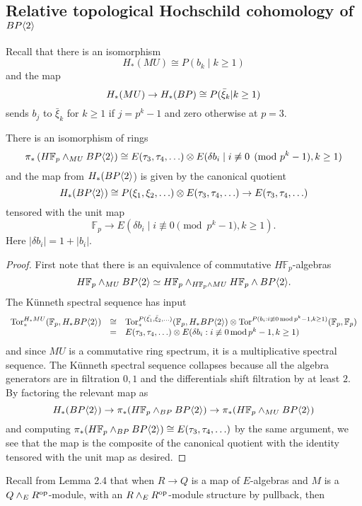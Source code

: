 \subsection{Relative topological Hochschild cohomology of $BP\langle 2 \rangle$}
Recall that there is an isomorphism 
\[ H_*(MU)\cong P(b_k \mid k\ge 1) \]
and the map 
\[ H_*(MU) \to  H_*(BP)\cong P(\bar{\xi}_k |k\ge 1) \]
sends $b_{j}$ to $\bar{\xi}_k$ for $k\ge 1$ if $j=p^k-1$ and zero otherwise at $p=3$. 

\begin{lem}
There is an isomorphism of rings 
\[ \pi_*\left (H\mathbb{F}_p\wedge_{MU}BP\langle 2 \rangle \right ) \cong  E(\tau_3,\tau_4,\ldots )\otimes E(\delta b_i \mid i\not \equiv 0 \pmod{p^k-1}, k\ge 1) \]
and the map from $H_*(BP\langle 2 \rangle$) is given by the canonical quotient 
\[ H_*(BP\langle 2 \rangle) \cong P(\xi_1,\xi_2,\ldots ) \otimes E(\tau_3,\tau_4,\ldots ) \to E(\tau_3,\tau_4,\ldots )  \]
tensored with the unit map
\[ \mathbb{F}_p \to E(\delta b_i \mid i\not \equiv 0 \pmod{p^k-1}, k\ge 1).\]
Here $|\delta b_i|=1+|b_i|$.
\end{lem}
\begin{proof}
First note that there is an equivalence of commutative $H\mathbb{F}_p$-algebras
\[H\mathbb{F}_p\wedge_{MU}BP\langle 2 \rangle \simeq H\mathbb{F}_p\wedge_{H\mathbb{F}_p\wedge MU}H\mathbb{F}_p\wedge BP\langle 2 \rangle.\]
The K\"unneth spectral sequence has input 
\[ 
\begin{array}{rcl}
\operatorname{Tor}_*^{H_*MU}(\mathbb{F}_p, H_*BP\langle 2 \rangle)&\cong& \operatorname{Tor}_*^{P(\bar{\xi_1},\bar{\xi}_2,\ldots )}(\mathbb{F}_p, H_*BP\langle 2 \rangle)\otimes \operatorname{Tor}^{P(  b_i :  i\not\equiv 0\thinspace \text{mod}\thinspace p^k-1, k\ge 1)}(\mathbb{F}_p,\mathbb{F}_p)\\
&=& E(\tau_3,\tau_4,\ldots )\otimes E( \delta b_i : i\not\equiv  0\thinspace \text{mod}\thinspace p^k-1, k\ge 1)
\end{array}
\]
and since $MU$ is a commutative ring spectrum, it is a multiplicative spectral sequence.
The K\"unneth spectral sequence collapses because all the algebra generators are in filtration $0,1$ and the differentials shift filtration by at least $2$. By factoring the relevant map as  
\[H_*(BP\langle 2 \rangle ) \to  \pi_*( H\mathbb{F}_p\wedge_{BP}BP\langle 2 \rangle)\to \pi_*(H\mathbb{F}_p\wedge_{MU}BP\langle 2 \rangle ) \]
and computing $\pi_*(H\mathbb{F}_p\wedge_{BP}BP\langle 2 \rangle)\cong E(\tau_3,\tau_4,\ldots )$ by the same argument, we see that the map is the composite of the canonical quotient 
with the identity tensored with the unit map 
as desired. 
\end{proof}
Recall from Lemma 2.4 \cite{AHL} that when $R\to Q$ is a map of $E$-algebras and $M$ is a $Q\wedge_E R^{\mathrm{op}}$-module, with an $R\wedge_E R^{\mathrm{op}}$-module structure by pullback, then 

